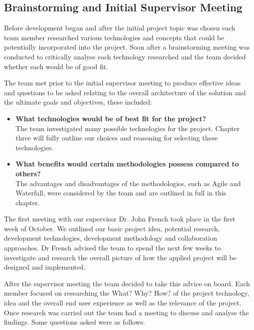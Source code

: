 \subsection{Brainstorming and Initial Supervisor Meeting}
Before development began and after the initial project topic was chosen each team member researched various technologies and concepts that could be potentially incorporated into the project. Soon after a brainstorming meeting was conducted to critically analyse each technology researched and the team decided whether each would be of good fit.

\vspace{5mm} %

The team met prior to the initial supervisor meeting to produce effective ideas and questions to be asked relating to the overall architecture of the solution and the ultimate goals and objectives, these included:
\vspace{5mm} %

\begin{itemize}


    \item \textbf{What technologies would be of best fit for the project?} \\
The team investigated many possible technologies for the project. Chapter three will fully outline our choices and reasoning for selecting these technologies.

    \item \textbf{What benefits would certain methodologies possess compared to others?}\\
The advantages and disadvantages of the methodologies, such as Agile and Waterfall, were considered by the team and are outlined in full in this chapter.
\end{itemize}

The first meeting with our supervisor Dr. John French took place in the first week of October. We outlined our basic project idea, potential research, development technologies, development methodology and collaboration approaches. Dr French advised the team  to spend the next few weeks to investigate and research the overall picture of how the applied project will be designed and implemented.


\vspace{5mm} %

After the supervisor meeting the team decided to take this advice on board. Each member focused on researching the What? Why? How? of the project technology, idea and the overall end user experience as well as the relevance of the project. Once research was carried out the team had a meeting to discuss and  analyse the findings. Some questions asked were as follows:

